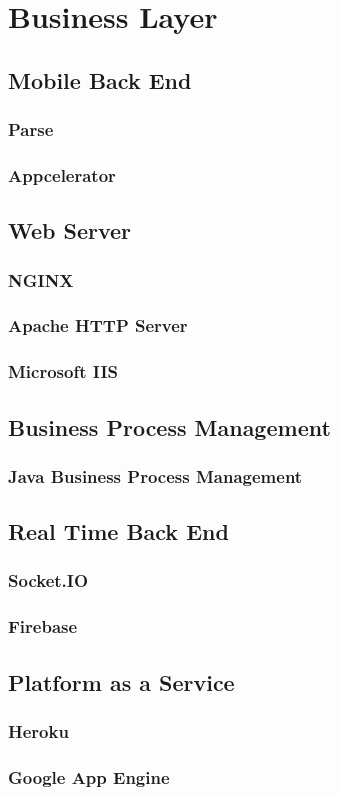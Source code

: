 \chapter{Business Layer}\label{ch:ch4label}

\section{Mobile Back End}

\subsection{Parse}
\subsection{Appcelerator}

\section{Web Server}

\subsection{NGINX}
\subsection{Apache HTTP Server}
\subsection{Microsoft IIS}

\section{Business Process Management}

\subsection{Java Business Process Management}

\section{Real Time Back End}

\subsection{Socket.IO}
\subsection{Firebase}


\section{Platform as a Service}
\subsection{Heroku}
\subsection{Google App Engine}



